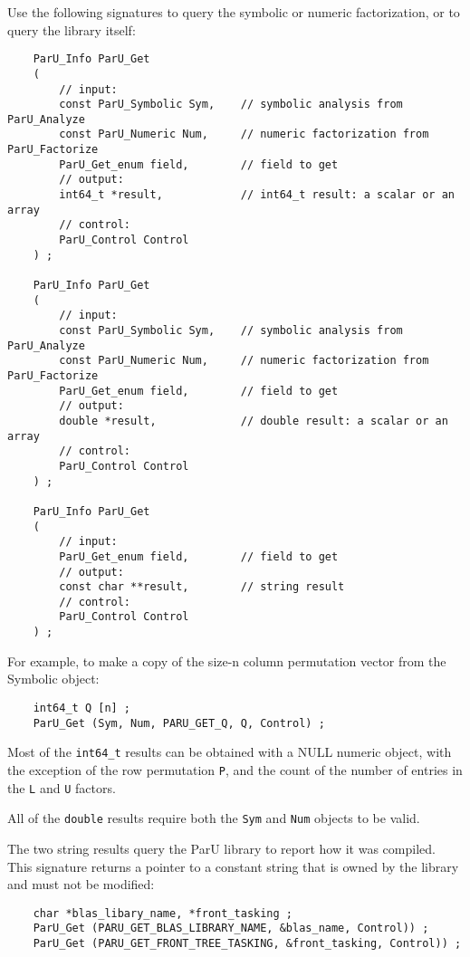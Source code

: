 \documentclass[12pt]{article}
\begin{document}
Use the following signatures to query the symbolic or numeric factorization, or
to query the library itself:

    {\footnotesize
    \begin{verbatim}
    ParU_Info ParU_Get
    (
        // input:
        const ParU_Symbolic Sym,    // symbolic analysis from ParU_Analyze
        const ParU_Numeric Num,     // numeric factorization from ParU_Factorize
        ParU_Get_enum field,        // field to get
        // output:
        int64_t *result,            // int64_t result: a scalar or an array
        // control:
        ParU_Control Control
    ) ;

    ParU_Info ParU_Get
    (
        // input:
        const ParU_Symbolic Sym,    // symbolic analysis from ParU_Analyze
        const ParU_Numeric Num,     // numeric factorization from ParU_Factorize
        ParU_Get_enum field,        // field to get
        // output:
        double *result,             // double result: a scalar or an array
        // control:
        ParU_Control Control
    ) ;

    ParU_Info ParU_Get
    (
        // input:
        ParU_Get_enum field,        // field to get
        // output:
        const char **result,        // string result
        // control:
        ParU_Control Control
    ) ; \end{verbatim}}

For example, to make a copy of the size-n column permutation vector from the
Symbolic object:

    {\footnotesize
    \begin{verbatim}
    int64_t Q [n] ;
    ParU_Get (Sym, Num, PARU_GET_Q, Q, Control) ; \end{verbatim}}

Most of the \verb'int64_t' results can be obtained with a NULL numeric object,
with the exception of the row permutation \verb'P', and the count of the number
of entries in the \verb'L' and \verb'U' factors.

All of the \verb'double' results require both the \verb'Sym' and \verb'Num'
objects to be valid.

The two string results query the ParU library to report how it was compiled.
This signature returns a pointer to a constant string that is owned by
the library and must not be modified:

    {\footnotesize
    \begin{verbatim}
    char *blas_libary_name, *front_tasking ;
    ParU_Get (PARU_GET_BLAS_LIBRARY_NAME, &blas_name, Control)) ;
    ParU_Get (PARU_GET_FRONT_TREE_TASKING, &front_tasking, Control)) ; \end{verbatim}}
\end{document}
